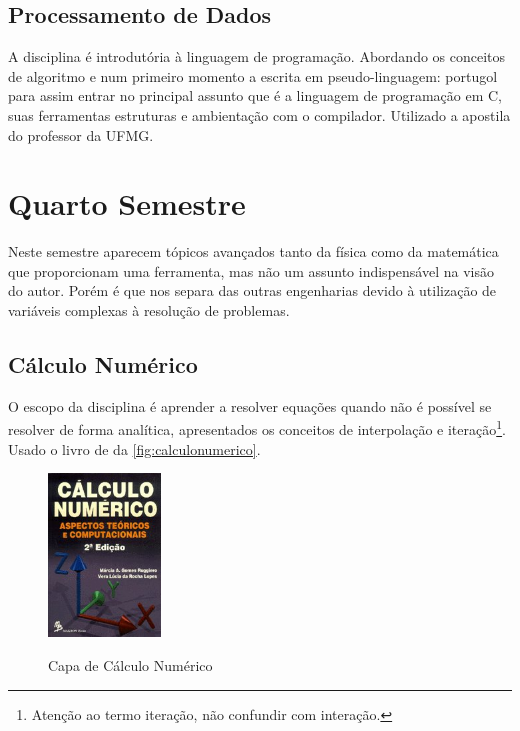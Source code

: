 \documentclass[
	12pt,				%
	openright,			%
	oneside,			%
	a4paper,			%
	english,			%
	french,				%
	spanish,			%
	brazil				%
	]{abntex2}
\begin{document}
\section{Processamento de Dados}\label{sec:prd}
A disciplina é introdutória à linguagem de programação. Abordando os conceitos de algoritmo e num primeiro momento a escrita em pseudo-linguagem: portugol para assim entrar no principal assunto que é a linguagem de programação em C, suas ferramentas estruturas e ambientação com o compilador. Utilizado a apostila do professor  da UFMG.

\chapter{Quarto Semestre}\label{cap:4sem}
Neste semestre aparecem tópicos avançados tanto da física como da matemática que proporcionam uma ferramenta, mas não um assunto indispensável na visão do autor. Porém é que nos separa das outras engenharias devido à utilização de variáveis complexas à resolução de problemas.

\section{Cálculo Numérico}\label{sec:can}
O escopo da disciplina é aprender a resolver equações quando não é possível se resolver de forma analítica, apresentados os conceitos de interpolação e iteração\footnote{Atenção ao termo iteração, não confundir com interação.}. Usado o livro de  da \autoref{fig:calculonumerico}.

\begin{figure}[!htb]
	\caption{Capa de Cálculo Numérico}
	\centering
	\includegraphics[width=3cm]{calculonumerico.jpg}
	\label{fig:calculonumerico}
\end{figure}
\end{document}
